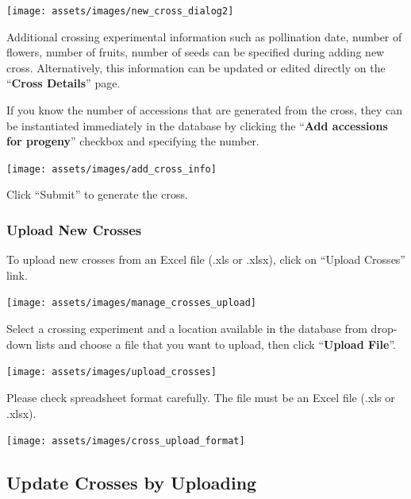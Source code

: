 \documentclass[
  12pt,
]{book}
\begin{document}
\begin{center}\texttt{[image: assets/images/new\_cross\_dialog2]} \end{center}

Additional crossing experimental information such as pollination date, number of flowers, number of fruits, number of seeds can be specified during adding new cross. Alternatively, this information can be updated or edited directly on the ``\textbf{Cross Details}'' page.

If you know the number of accessions that are generated from the cross, they can be instantiated immediately in the database by clicking the ``\textbf{Add accessions for progeny}'' checkbox and specifying the number.

\begin{center}\texttt{[image: assets/images/add\_cross\_info]} \end{center}

Click ``Submit'' to generate the cross.

\hypertarget{upload-new-crosses}{%
\subsubsection*{Upload New Crosses}\label{upload-new-crosses}}


To upload new crosses from an Excel file (.xls or .xlsx), click on ``Upload Crosses'' link.

\begin{center}\texttt{[image: assets/images/manage\_crosses\_upload]} \end{center}

Select a crossing experiment and a location available in the database from drop-down lists and choose a file that you want to upload, then click ``\textbf{Upload File}''.

\begin{center}\texttt{[image: assets/images/upload\_crosses]} \end{center}

Please check spreadsheet format carefully. The file must be an Excel file (.xls or .xlsx).

\begin{center}\texttt{[image: assets/images/cross\_upload\_format]} \end{center}

\hypertarget{update-crosses-by-uploading}{%
\subsection{Update Crosses by Uploading}\label{update-crosses-by-uploading}}
\end{document}
